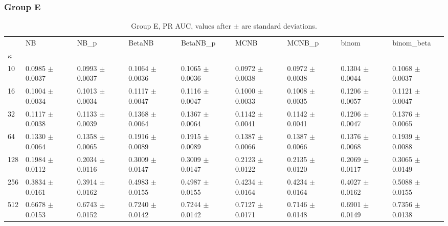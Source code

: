 \subsubsection*{Group E}
\begin{table}[H]
\centering
\begin{adjustbox}{max width=\linewidth}
\begin{tabular}{lllllllll}
\toprule
 & NB & NB\_p & BetaNB & BetaNB\_p & MCNB & MCNB\_p & binom & binom\_beta \\
$\kappa$ &  &  &  &  &  &  &  &  \\
\midrule
10 & 0.0985 $\pm$ 0.0037 & 0.0993 $\pm$ 0.0037 & 0.1064 $\pm$ 0.0036 & 0.1065 $\pm$ 0.0036 & 0.0972 $\pm$ 0.0038 & 0.0972 $\pm$ 0.0038 & 0.1304 $\pm$ 0.0044 & 0.1068 $\pm$ 0.0037 \\
16 & 0.1004 $\pm$ 0.0034 & 0.1013 $\pm$ 0.0034 & 0.1117 $\pm$ 0.0047 & 0.1116 $\pm$ 0.0047 & 0.1000 $\pm$ 0.0033 & 0.1008 $\pm$ 0.0035 & 0.1206 $\pm$ 0.0057 & 0.1121 $\pm$ 0.0047 \\
32 & 0.1117 $\pm$ 0.0038 & 0.1133 $\pm$ 0.0039 & 0.1368 $\pm$ 0.0064 & 0.1367 $\pm$ 0.0064 & 0.1142 $\pm$ 0.0041 & 0.1142 $\pm$ 0.0041 & 0.1206 $\pm$ 0.0047 & 0.1376 $\pm$ 0.0065 \\
64 & 0.1330 $\pm$ 0.0064 & 0.1358 $\pm$ 0.0065 & 0.1916 $\pm$ 0.0089 & 0.1915 $\pm$ 0.0089 & 0.1387 $\pm$ 0.0066 & 0.1387 $\pm$ 0.0066 & 0.1376 $\pm$ 0.0068 & 0.1939 $\pm$ 0.0088 \\
128 & 0.1984 $\pm$ 0.0112 & 0.2034 $\pm$ 0.0116 & 0.3009 $\pm$ 0.0147 & 0.3009 $\pm$ 0.0147 & 0.2123 $\pm$ 0.0122 & 0.2135 $\pm$ 0.0120 & 0.2069 $\pm$ 0.0117 & 0.3065 $\pm$ 0.0149 \\
256 & 0.3834 $\pm$ 0.0161 & 0.3914 $\pm$ 0.0162 & 0.4983 $\pm$ 0.0155 & 0.4987 $\pm$ 0.0155 & 0.4234 $\pm$ 0.0164 & 0.4234 $\pm$ 0.0164 & 0.4027 $\pm$ 0.0162 & 0.5088 $\pm$ 0.0155 \\
512 & 0.6678 $\pm$ 0.0153 & 0.6743 $\pm$ 0.0152 & 0.7240 $\pm$ 0.0142 & 0.7244 $\pm$ 0.0142 & 0.7127 $\pm$ 0.0171 & 0.7146 $\pm$ 0.0148 & 0.6901 $\pm$ 0.0149 & 0.7356 $\pm$ 0.0138 \\
\bottomrule
\end{tabular}

\end{adjustbox}
\caption{Group E, PR AUC, values after $\pm$ are standard deviations.}
\end{table}

